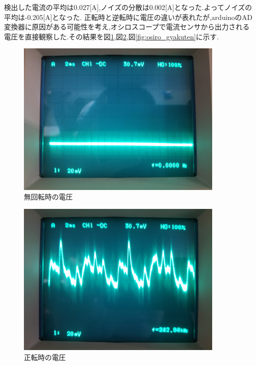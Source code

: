 検出した電流の平均は0.027[A],ノイズの分散は0.002[A]となった.よってノイズの平均は-0.205[A]となった.
正転時と逆転時に電圧の違いが表れたが,arduinoのAD変換器に原因がある可能性を考え,オシロスコープで電流センサから出力される電圧を直接観察した.その結果を図\ref{fig:osiro_0},図\ref{fig:osiro_seiten},図\ref{fig:osiro_gyakuten}に示す.

\begin{figure}[htbp]
 \begin{center}
    \includegraphics[width=100mm]{img/osiro_0.jpg}
    \end{center}
  \caption{無回転時の電圧}
 \label{fig:osiro_0}
\end{figure}

\begin{figure}[htbp]
 \begin{center}
    \includegraphics[width=100mm]{img/osiro_seiten.jpg}
    \end{center}
  \caption{正転時の電圧}
 \label{fig:osiro_seiten}
\end{figure}

